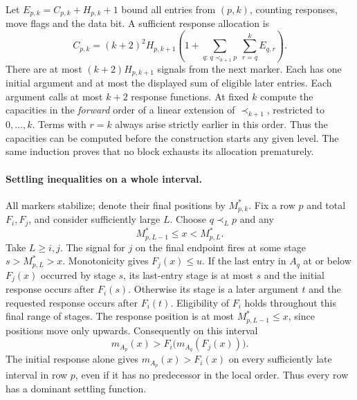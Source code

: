 \documentclass[11pt]{article}
\begin{document}
Let $E_{p,k}=C_{p,k}+H_{p,k}+1$ bound all entries from $(p,k)$, counting responses, move flags and the data bit. A sufficient response allocation is
\[
 C_{p,k}=(k+2)^2 H_{p,k+1}
 \left(1+\sum_{q:\,q\prec_{k+1}p}\ \sum_{r=q}^{k} E_{q,r}\right).
\]
There are at most $(k+2)H_{p,k+1}$ signals from the next marker. Each has one initial argument and at most the displayed sum of eligible later entries. Each argument calls at most $k+2$ response functions. At fixed $k$ compute the capacities in the \emph{forward} order of a linear extension of $\prec_{k+1}$, restricted to $0,\ldots,k$. Terms with $r=k$ always arise strictly earlier in this order. Thus the capacities can be computed before the construction starts any given level. The same induction proves that no block exhausts its allocation prematurely.

\paragraph{Settling inequalities on a whole interval.}
All markers stabilize; denote their final positions by $M^*_{p,k}$. Fix a row $p$ and total $F_i,F_j$, and consider sufficiently large $L$. Choose $q\prec_L p$ and any
\[
                   M^*_{p,L-1}\le x<M^*_{p,L}.
\]
Take $L\ge i,j$. The signal for $j$ on the final endpoint fires at some stage $s>M^*_{p,L}>x$. Monotonicity gives $F_j(x)\le u$. If the last entry in $A_q$ at or below $F_j(x)$ occurred by stage $s$, its last-entry stage is at most $s$ and the initial response occurs after $F_i(s)$. Otherwise its stage is a later argument $t$ and the requested response occurs after $F_i(t)$. Eligibility of $F_i$ holds throughout this final range of stages. The response position is at most $M^*_{p,L-1}\le x$, since positions move only upwards. Consequently on this interval
\[
             m_{A_p}(x)>F_i\bigl(m_{A_q}(F_j(x))\bigr).       \tag{1}
\]
The initial response alone gives $m_{A_p}(x)>F_i(x)$ on every sufficiently late interval in row $p$, even if it has no predecessor in the local order. Thus every row has a dominant settling function.
\end{document}
